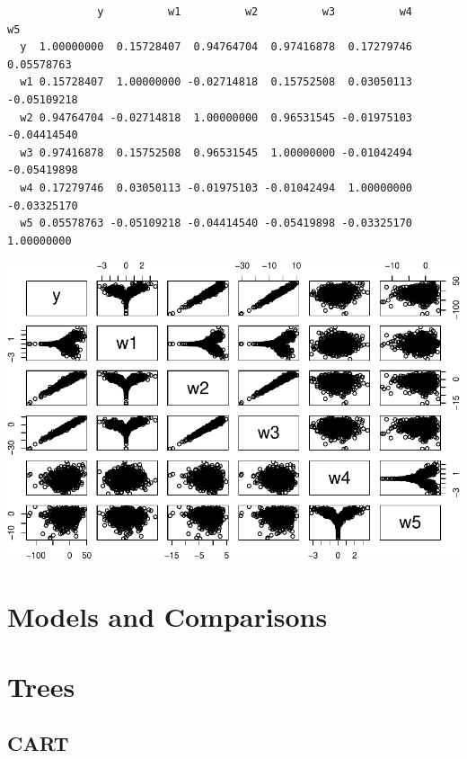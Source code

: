 \documentclass[12pt,twoside]{reedthesis}
\begin{document}
  \begin{verbatim}
              y          w1          w2          w3          w4          w5
  y  1.00000000  0.15728407  0.94764704  0.97416878  0.17279746  0.05578763
  w1 0.15728407  1.00000000 -0.02714818  0.15752508  0.03050113 -0.05109218
  w2 0.94764704 -0.02714818  1.00000000  0.96531545 -0.01975103 -0.04414540
  w3 0.97416878  0.15752508  0.96531545  1.00000000 -0.01042494 -0.05419898
  w4 0.17279746  0.03050113 -0.01975103 -0.01042494  1.00000000 -0.03325170
  w5 0.05578763 -0.05109218 -0.04414540 -0.05419898 -0.03325170  1.00000000
  \end{verbatim}
  
  \begin{Shaded}
  \begin{Highlighting}[]
  \end{Highlighting}
  \end{Shaded}
  
  \begin{center}\includegraphics{Thesis_files/figure-latex/logAbs-1} \end{center}
  
  \section{Models and Comparisons}\label{models-and-comparisons}
  
  \section{Trees}\label{trees-1}
  
  \subsection{CART}\label{cart}
  
\end{document}
